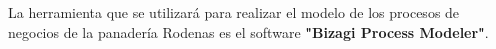 La herramienta que se utilizará para realizar el modelo de los procesos de negocios de la panadería Rodenas es el software \textbf{"Bizagi Process Modeler"}.